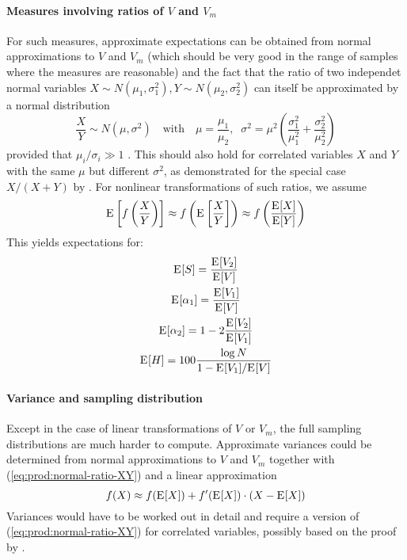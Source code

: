 \documentclass[a4paper]{article}
\begin{document}
\paragraph*{Measures involving ratios of $V$ and $V_m$}
For such measures, approximate expectations can be obtained from normal
approximations to $V$ and $V_m$ (which should be very good in the range of
samples where the measures are reasonable) and the fact that the ratio of two
independet normal variables
$X\sim N(\mu_1, \sigma_1^2), Y\sim N(\mu_2, \sigma_2^2)$ can itself be
approximated by a normal distribution
\begin{equation}
  \label{eq:prod:normal-ratio-XY}
  \frac{X}{Y} \sim N(\mu, \sigma^2)
  \quad\text{with}\quad
  \mu = \frac{\mu_1}{\mu_2},\;\;
  \sigma^2 = \mu^2 \left( \frac{\sigma_1^2}{\mu_1^2} + \frac{\sigma_2^2}{\mu_2^2} \right)
\end{equation}
provided that $\mu_i / \sigma_i \gg 1$ \citep[313]{DiazFrances:Rubio:13}.
This should also hold for correlated variables $X$ and $Y$ with the same $\mu$
but different $\sigma^2$, as demonstrated for the special case $X / (X+Y)$ by
\citet[Lemma A.8]{Evert:04phd}.  For nonlinear transformations of such ratios,
we assume
\begin{equation}
  \mathrm{E}_{}\left[ f\left( \frac{X}{Y} \right) \right]
  \approx f\left( \mathrm{E}_{}\left[\frac{X}{Y}\right] \right)
  \approx f\left( \frac{\mathrm{E}_{}[X]}{\mathrm{E}_{}[Y]} \right)
\end{equation}
This yields expectations for:
\begin{gather}
  \mathrm{E}_{}[S] = \frac{\mathrm{E}_{}[V_2]}{\mathrm{E}_{}[V]} \\
  \mathrm{E}_{}[\alpha_1] = \frac{\mathrm{E}_{}[V_1]}{\mathrm{E}_{}[V]} \\
  \mathrm{E}_{}[\alpha_2] = 1 - 2 \frac{\mathrm{E}_{}[V_2]}{\mathrm{E}_{}[V_1]} \\
  \mathrm{E}_{}[H] = 100 \frac{\log N}{1 - \mathrm{E}_{}[V_1] / \mathrm{E}_{}[V]}
\end{gather}

\paragraph*{Variance and sampling distribution}
Except in the case of linear transformations of $V$ or $V_m$, the full
sampling distributions are much harder to compute.  Approximate variances
could be determined from normal approximations to $V$ and $V_m$ together with
(\ref{eq:prod:normal-ratio-XY}) and a linear approximation
\[
  f(X) \approx f(\mathrm{E}_{}[X]) + f'(\mathrm{E}_{}[X])\cdot (X - \mathrm{E}_{}[X])
\]
Variances would have to be worked out in detail and require a version of
(\ref{eq:prod:normal-ratio-XY}) for correlated variables, possibly based
on the proof by \citet[Lemma A.8]{Evert:04phd}.
\end{document}
